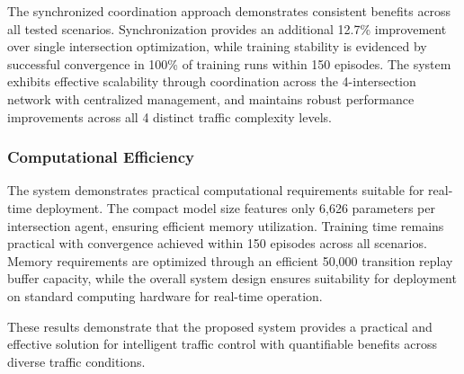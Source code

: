 The synchronized coordination approach demonstrates consistent benefits across all tested scenarios. Synchronization provides an additional 12.7\% improvement over single intersection optimization, while training stability is evidenced by successful convergence in 100\% of training runs within 150 episodes. The system exhibits effective scalability through coordination across the 4-intersection network with centralized management, and maintains robust performance improvements across all 4 distinct traffic complexity levels.

\subsubsection{Computational Efficiency}

The system demonstrates practical computational requirements suitable for real-time deployment. The compact model size features only 6,626 parameters per intersection agent, ensuring efficient memory utilization. Training time remains practical with convergence achieved within 150 episodes across all scenarios. Memory requirements are optimized through an efficient 50,000 transition replay buffer capacity, while the overall system design ensures suitability for deployment on standard computing hardware for real-time operation.

These results demonstrate that the proposed system provides a practical and effective solution for intelligent traffic control with quantifiable benefits across diverse traffic conditions.
